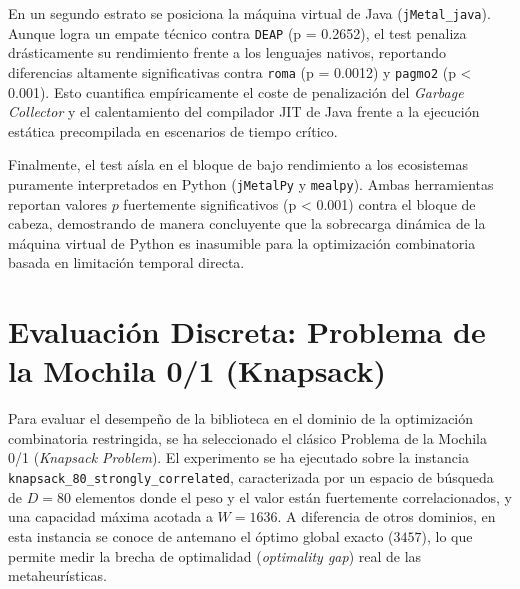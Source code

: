 \documentclass[12pt,a4paper,twoside,openright]{book}
\begin{document}
    En un segundo estrato se posiciona la máquina virtual de Java (\texttt{jMetal\_java}). Aunque logra un empate técnico contra \texttt{DEAP} (p = 0.2652), el test penaliza drásticamente su rendimiento frente a los lenguajes nativos, reportando diferencias altamente significativas contra \texttt{roma} (p = 0.0012) y \texttt{pagmo2} (p < 0.001). Esto cuantifica empíricamente el coste de penalización del \textit{Garbage Collector} y el calentamiento del compilador JIT de Java frente a la ejecución estática precompilada en escenarios de tiempo crítico.

    Finalmente, el test aísla en el bloque de bajo rendimiento a los ecosistemas puramente interpretados en Python (\texttt{jMetalPy} y \texttt{mealpy}). Ambas herramientas reportan valores $p$ fuertemente significativos (p < 0.001) contra el bloque de cabeza, demostrando de manera concluyente que la sobrecarga dinámica de la máquina virtual de Python es inasumible para la optimización combinatoria basada en limitación temporal directa.


\section{Evaluación Discreta: Problema de la Mochila 0/1 (Knapsack)}
    Para evaluar el desempeño de la biblioteca en el dominio de la optimización combinatoria restringida, se ha seleccionado el clásico Problema de la Mochila 0/1 (\textit{Knapsack Problem}). El experimento se ha ejecutado sobre la instancia \texttt{knapsack\_80\_strongly\_correlated}, caracterizada por un espacio de búsqueda de $D=80$ elementos donde el peso y el valor están fuertemente correlacionados, y una capacidad máxima acotada a $W=1636$. A diferencia de otros dominios, en esta instancia se conoce de antemano el óptimo global exacto ($3457$), lo que permite medir la brecha de optimalidad (\textit{optimality gap}) real de las metaheurísticas.
\end{document}
